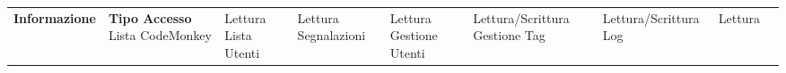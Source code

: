 \begin{center}
    \phantom{M}%


    \begin{tabularx}
        {\textwidth} {|X|X|}
        \hline  {}
        \n      {}
        \large \textbf{Informazione}  & \centering\large\textbf{Tipo Accesso}
        \n      Lista CodeMonkey      & Lettura
        \n      Lista Utenti          & Lettura
        \n      Segnalazioni          & Lettura
        \n      Gestione Utenti & Lettura/Scrittura
        \n      Gestione Tag & Lettura/Scrittura
        \n      Log                   & Lettura
        \n
    \end{tabularx}\label{tab:monkeytable:problema:tabellaRuoloInformazioni:Amministratore}
\end{center}
